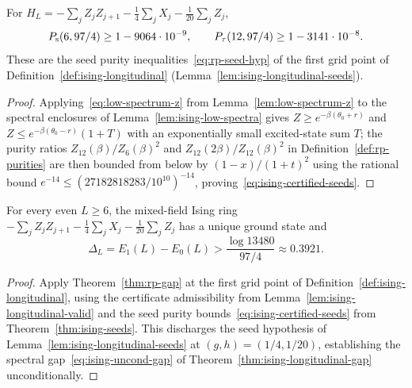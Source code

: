 \begin{theorem}
  \label{thm:ising-seeds}
  \leanok
  For \(H_L = -\sum_j Z_j Z_{j+1} - \tfrac14 \sum_j X_j - \tfrac1{20} \sum_j Z_j\),
  \begin{equation}
    \label{eq:ising-certified-seeds}
    P_{\mathrm{s}}(6, 97/4) \ge 1 - 9064 \cdot 10^{-9}, \qquad P_{\tau}(12, 97/4) \ge 1 - 3141 \cdot 10^{-8}.
  \end{equation}
  These are the seed purity inequalities~\eqref{eq:rp-seed-hyp} of the first grid point of
  Definition~\ref{def:ising-longitudinal} (Lemma~\ref{lem:ising-longitudinal-seeds}).
\end{theorem}
\begin{proof}
  \leanok
  Applying~\eqref{eq:low-spectrum-z} from Lemma~\ref{lem:low-spectrum-z} to the spectral enclosures
  of Lemma~\ref{lem:ising-low-spectra} gives \(Z \ge e^{-\beta(\theta_0 + r)}\) and
  \(Z \le e^{-\beta(\theta_0 - r)}(1 + T)\) with an exponentially small excited-state sum \(T\);
  the purity ratios \(Z_{12}(\beta)/Z_6(\beta)^2\) and \(Z_{12}(2\beta)/Z_{12}(\beta)^2\) in
  Definition~\ref{def:rp-purities} are then bounded from below by \((1 - x)/(1 + t)^2\) using the
  rational bound \(e^{-14} \le (27182818283/10^{10})^{-14}\), proving~\eqref{eq:ising-certified-seeds}.
\end{proof}

\begin{theorem}
  \label{thm:ising-gap}
  \leanok
  For every even \(L \ge 6\), the mixed-field Ising ring
  \(-\sum_j Z_j Z_{j+1} - \tfrac14 \sum_j X_j - \tfrac1{20} \sum_j Z_j\) has a unique ground state
  and
  \begin{equation}
    \label{eq:ising-uncond-gap}
    \Delta_L = E_1(L) - E_0(L) > \frac{\log 13480}{97/4} \approx 0.3921 .
  \end{equation}
\end{theorem}
\begin{proof}
  \leanok
  Apply Theorem~\ref{thm:rp-gap} at the first grid point of Definition~\ref{def:ising-longitudinal},
  using the certificate admissibility from Lemma~\ref{lem:ising-longitudinal-valid} and the seed
  purity bounds~\eqref{eq:ising-certified-seeds} from Theorem~\ref{thm:ising-seeds}. This discharges
  the seed hypothesis of Lemma~\ref{lem:ising-longitudinal-seeds} at \((g, h) = (1/4, 1/20)\),
  establishing the spectral gap~\eqref{eq:ising-uncond-gap} of Theorem~\ref{thm:ising-longitudinal-gap}
  unconditionally.
\end{proof}

